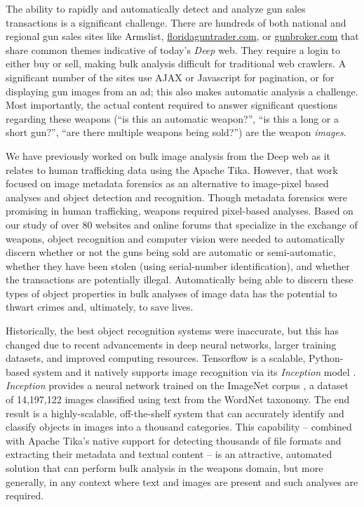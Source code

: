 The ability to rapidly and automatically detect and analyze gun sales transactions is a significant challenge. There are hundreds of both national and regional gun sales sites like Armslist, \url{floridaguntrader.com}, or \url{gunbroker.com} that share common themes indicative of today's {\em Deep} web. They require a login to either buy or sell, making bulk analysis difficult for traditional web crawlers. A significant number of the sites use AJAX or Javascript for pagination, or for displaying gun images from an ad; this also makes automatic analysis a challenge. Most importantly, the actual content required to answer significant questions regarding these weapons (``is this an automatic weapon?'', ``is this a long or a short gun?'', ``are there multiple weapons being sold?'') are the weapon {\em images}.

We have previously worked on bulk image analysis from the Deep web as it relates to human trafficking data \cite{mattmann7tg} using the Apache Tika. However, that work focused on image metadata forensics as an alternative to image-pixel based analyses and object detection and recognition. Though metadata forensics were promising in human trafficking, weapons required pixel-based analyses. Based on our study of over 80 websites and online forums that specialize in the exchange of weapons, object recognition and computer vision were needed to automatically discern whether or not the guns being sold are automatic or semi-automatic, whether they have been stolen (using serial-number identification), and whether the transactions are potentially illegal. Automatically being able to discern these types of object properties in bulk analyses of image data has the potential to thwart crimes and, ultimately, to save lives.

Historically, the best object recognition systems were inaccurate, but this has changed due to recent advancements in deep neural networks, larger training datasets, and improved computing resources. Tensorflow is a scalable, Python-based system and it natively supports image recognition via its \textit{Inception} model \cite{abadi2016tensorflow}. \textit{Inception} provides a neural network trained on the ImageNet corpus \cite{krizhevsky2012imagenet}, a dataset of 14,197,122 images classified using text from the WordNet taxonomy. The end result is a highly-scalable, off-the-shelf system that can accurately identify and classify objects in images into a thousand categories. This capability -- combined with Apache Tika's native support for detecting thousands of file formats and extracting their metadata and textual content -- is an attractive, automated solution that can perform bulk analysis in the weapons domain, but more generally, in any context where text and images are present and such analyses are required.

